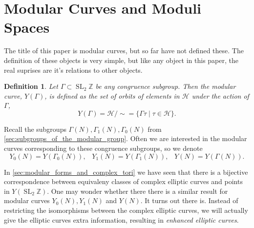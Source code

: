 \documentclass[a4paper]{article}
\theoremstyle{theoremdd}
\theoremstyle{definitiondd}
\newtheorem{definition}[theorem]{Definition}
\theoremstyle{remarkdd}
\newcommand{\Z}{\mathbb{Z}}
\DeclareMathOperator{\SL}{SL}
\begin{document}
\section{Modular Curves and Moduli Spaces} \label{sec:modular_curves_and_moduli_spaces}
The title of this paper is modular curves, but so far have not defined these. 
The definition of these objects is very simple, but like any object in this paper, the real suprises are it's relations to other objects. 
\begin{definition}
	Let $\Gamma \subset \SL_2\Z$ be any congruence subgroup. Then the \emph{modular curve}, $Y(\Gamma)$, is defined as the set of orbits of elements in  $\mathcal{H} $ under  the action of $\Gamma$, \[
		Y(\Gamma) = \mathcal{H} / \sim = \{\Gamma \tau \;|\; \tau \in \mathcal{H} \} 
	.\] 
\end{definition}
Recall the subgroups $\Gamma(N), \Gamma_1(N), \Gamma_0(N)$ from \cref{sec:subgroups_of_the_modular_group}. 
Often we are interested in the modular curves corresponding to these congruence subgroups, so we denote \[
	Y_0(N) = Y(\Gamma_0(N)),\;\;\; Y_1(N) = Y(\Gamma_1(N)),\;\;\; Y(N) = Y(\Gamma(N))
.\]  
 
In \cref{sec:modular_forms_and_complex_tori} we have seen that there is a bijective correspondence between equivaleny classes of complex elliptic curves and points in $Y (\SL_2\Z)$. 
One may wonder whether there there is a similar result for modular curves $Y_0(N),Y_1(N)$ and $Y(N)$.
It turns out there is. 
Instead of restricting the isomorphisms between the complex elliptic curves, we will actually give the elliptic curves extra information, resulting in \emph{enhanced elliptic curves}. 
\end{document}
